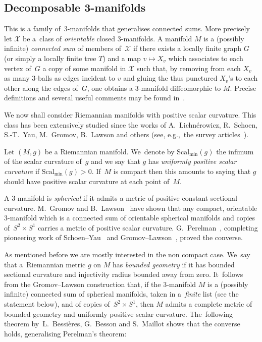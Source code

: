 \documentclass[pdftex]{sigma}
\numberwithin{equation}{section}
\def\Smin{\textrm{Scal}_\mathrm{min}}
\begin{document}
\subsection{Decomposable 3-manifolds}\label{sec:decomposable}

This is a family of~$3$-manifolds that generalises connected sums. More precisely let $\mathcal X$ be a~class of {\it orientable }closed $3$-manifolds. A manifold $M$ is a (possibly infinite)
{\it connected sum} of members of~$\mathcal X$ if there exists a locally finite graph $G$ (or simply a locally finite tree $T$) and a map $v\mapsto X_v$ which associates to each vertex of~$G$ a copy of some manifold in $\mathcal X$ such that, by removing from each $X_v$ as many $3$-balls as edges incident to $v$ and gluing the thus punctured $X_v$'s to each other
along the edges of~$G$, one obtains a $3$-manifold diffeomorphic to $M$. Precise definitions and several useful comments may be found in~\cite{BBM}.

\begin{figure}[h!]
\centering
{\hspace{3cm}}
\end{figure}

We now shall consider Riemannian manifolds with positive scalar curvature. This class has been extensively studied since the works of A.~Lichn\'erowicz, R.~Schoen, S.-T.~Yau, M.~Gromov, B.~Lawson and others (see, e.g.,~the survey articles~\cite{gromov:sign,rosenberg:report}).

Let $(M,g)$ be a Riemannian manifold. We~denote by $\Smin(g)$ the infimum of the scalar curvature of~$g$ and we say that $g$ has
{\it uniformly positive scalar curvature} if $\Smin(g)>0$. If~$M$ is compact then this amounts to saying that $g$ should have positive scalar curvature at each point of~$M$.

A $3$-manifold is {\it spherical} if it admits a metric of positive constant sectional curvature. M.~Gromov and B.~Lawson~\cite{gl:spin} have shown that any compact, orientable $3$-manifold which is a connected sum of orientable spherical manifolds and copies of~$S^2\times S^1$ carries a metric of positive scalar curvature. G.~Perelman~\cite{Per2}, completing pioneering work of Schoen--Yau~\cite{SchoenYau:incompressible} and Gromov--Lawson~\cite{GromovLawson}, proved the converse.

As mentioned before we are mostly interested in the non compact case. We~say that a~Riemannian metric $g$ on $M$ has {\it bounded geometry} if it has bounded sectional curvature
and injec\-tivity radius bounded away from zero. It~follows from the Gromov--Lawson construction that, if the $3$-manifold $M$ is a (possibly infinite) connected sum of spherical manifolds, taken in a~{\it finite} list (see the statement below), and of copies of~$S^2\times S^1$, then $M$ admits
a complete metric of bounded geometry and uniformly positive scalar curvature. The~following theorem by~L.~Bessières, G.~Besson and S.~Maillot shows that the converse holds, generalising Perelman's theorem:
\end{document}
